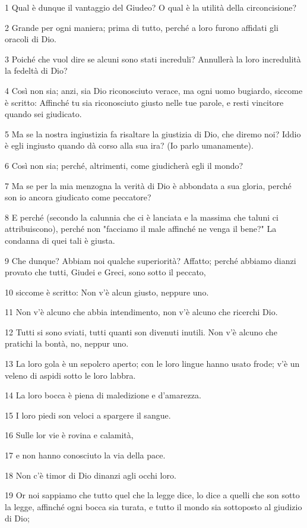 \par 1 Qual è dunque il vantaggio del Giudeo? O qual è la utilità della circoncisione?
\par 2 Grande per ogni maniera; prima di tutto, perché a loro furono affidati gli oracoli di Dio.
\par 3 Poiché che vuol dire se alcuni sono stati increduli? Annullerà la loro incredulità la fedeltà di Dio?
\par 4 Così non sia; anzi, sia Dio riconosciuto verace, ma ogni uomo bugiardo, siccome è scritto: Affinché tu sia riconosciuto giusto nelle tue parole, e resti vincitore quando sei giudicato.
\par 5 Ma se la nostra ingiustizia fa risaltare la giustizia di Dio, che diremo noi? Iddio è egli ingiusto quando dà corso alla sua ira? (Io parlo umanamente).
\par 6 Così non sia; perché, altrimenti, come giudicherà egli il mondo?
\par 7 Ma se per la mia menzogna la verità di Dio è abbondata a sua gloria, perché son io ancora giudicato come peccatore?
\par 8 E perché (secondo la calunnia che ci è lanciata e la massima che taluni ci attribuiscono), perché non "facciamo il male affinché ne venga il bene?" La condanna di quei tali è giusta.
\par 9 Che dunque? Abbiam noi qualche superiorità? Affatto; perché abbiamo dianzi provato che tutti, Giudei e Greci, sono sotto il peccato,
\par 10 siccome è scritto: Non v'è alcun giusto, neppure uno.
\par 11 Non v'è alcuno che abbia intendimento, non v'è alcuno che ricerchi Dio.
\par 12 Tutti si sono sviati, tutti quanti son divenuti inutili. Non v'è alcuno che pratichi la bontà, no, neppur uno.
\par 13 La loro gola è un sepolcro aperto; con le loro lingue hanno usato frode; v'è un veleno di aspidi sotto le loro labbra.
\par 14 La loro bocca è piena di maledizione e d'amarezza.
\par 15 I loro piedi son veloci a spargere il sangue.
\par 16 Sulle lor vie è rovina e calamità,
\par 17 e non hanno conosciuto la via della pace.
\par 18 Non c'è timor di Dio dinanzi agli occhi loro.
\par 19 Or noi sappiamo che tutto quel che la legge dice, lo dice a quelli che son sotto la legge, affinché ogni bocca sia turata, e tutto il mondo sia sottoposto al giudizio di Dio;
